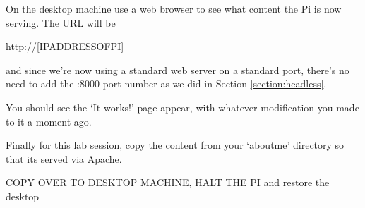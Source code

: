 On the desktop machine use a web browser to see what content the Pi is now serving. The URL will be 

\begin{ttoutenv}
http://[IPADDRESSOFPI]
\end{ttoutenv}

and since we're now using a standard web server on a standard port, there's no need to add the :8000 port number as we did in Section \ref{section:headless}. 

You should see the `It works!' page appear, with whatever modification you made to it a moment ago.

Finally for this lab session, copy the content from your `aboutme' directory so that its served via Apache.  

\begin{note}
COPY OVER TO DESKTOP MACHINE, HALT THE PI and restore the desktop
\end{note}

